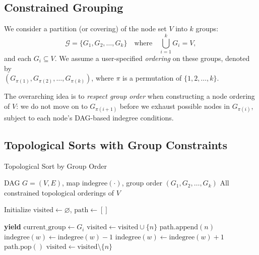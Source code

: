 \subsection{Constrained Grouping}
We consider a partition (or covering) of the node set $V$ into $k$ groups: 
\[
  \mathcal{G} = \{G_1, G_2, \dots, G_k\} 
  \quad \text{where} \quad
  \bigcup_{i=1}^{k} G_i = V, 
\]
and each $G_i \subseteq V$. We assume a user-specified \emph{ordering} on these groups, denoted by \\ $(G_{\pi(1)}, G_{\pi(2)}, \dots, G_{\pi(k)})$, where $\pi$ is a permutation of $\{1,2,\ldots,k\}$. 

The overarching idea is to \emph{respect group order} when constructing a node ordering of $V$: we do not move on to $G_{\pi(i+1)}$ before we exhaust possible nodes in $G_{\pi(i)}$, subject to each node's DAG-based indegree conditions.

\subsection{Topological Sorts with Group Constraints}
\label{sec:topo-group}
\begin{algorithm}[H]
\caption{Topological Sort by Group Order}
\label{alg:topological-sorts-by-group}
\begin{algorithmic}[1]
\Require DAG $G=(V,E)$,  map $\text{indegree}(\cdot)$, group order $(G_1, G_2, \dots, G_k)$
\Ensure All constrained topological orderings of $V$

\State Initialize $\text{visited} \gets \varnothing$, $\text{path} \gets []$

        \State \textbf{yield}  
        \State \Return
    \EndIf
    \State $\text{current\_group} \gets G_i$
            \State $\text{visited} \gets \text{visited} \cup \{n\}$
            \State $\text{path}.\text{append}(n)$
                \State $\text{indegree}(w) \gets \text{indegree}(w) - 1$
            \EndFor
            \State {}
                \State $\text{indegree}(w) \gets \text{indegree}(w) + 1$
            \EndFor
            \State $\text{path}.\text{pop}()$
            \State $\text{visited} \gets \text{visited} \setminus \{n\}$
        \EndIf
    \EndFor
        \State {}
    \EndIf
\EndFunction

\State {}

\end{algorithmic}
\end{algorithm}

